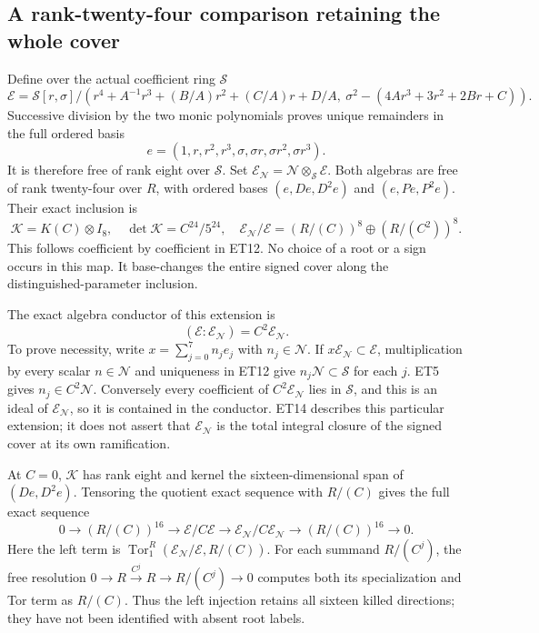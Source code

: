 \documentclass[11pt]{article}
\begin{document}
\subsection{A rank-twenty-four comparison retaining the whole cover}
Define over the actual coefficient ring $\mathscr S$
\[
 \mathscr E=\mathscr S[r,\sigma]/
 \left(r^4+A^{-1}r^3+(B/A)r^2+(C/A)r+D/A,\
       \sigma^2-(4Ar^3+3r^2+2Br+C)\right).
 \tag{ET11}
\]
Successive division by the two monic polynomials proves unique
remainders in the full ordered basis
\[
 e=(1,r,r^2,r^3,\sigma,\sigma r,\sigma r^2,\sigma r^3).
 \tag{ET12}
\]
It is therefore free of rank eight over $\mathscr S$.
Set $\mathscr E_{\mathscr N}=\mathscr N\otimes_{\mathscr S}\mathscr E$.
Both algebras are free of rank twenty-four over $R$, with ordered
bases $(e,De,D^2e)$ and $(e,Pe,P^2e)$. Their exact inclusion is
\[
 \mathcal K=K(C)\otimes I_8,\quad
 \det\mathcal K=C^{24}/5^{24},\quad
 \mathscr E_{\mathscr N}/\mathscr E
 =(R/(C))^8\oplus(R/(C^2))^8 .
 \tag{ET13}
\]
This follows coefficient by coefficient in ET12.
No choice of a root or a sign occurs in this map. It base-changes the
entire signed cover along the distinguished-parameter inclusion.

The exact algebra conductor of this extension is
\[
 (\mathscr E:\mathscr E_{\mathscr N})=C^2\mathscr E_{\mathscr N}.
 \tag{ET14}
\]
To prove necessity, write $x=\sum_{j=0}^7 n_j e_j$ with $n_j\in\mathscr N$.
If $x\mathscr E_{\mathscr N}\subset\mathscr E$, multiplication by every
scalar $n\in\mathscr N$ and uniqueness in ET12 give
$n_j\mathscr N\subset\mathscr S$ for each $j$. ET5 gives
$n_j\in C^2\mathscr N$. Conversely every coefficient of
$C^2\mathscr E_{\mathscr N}$ lies in $\mathscr S$, and this is an
ideal of $\mathscr E_{\mathscr N}$, so it is contained in the conductor.
ET14 describes this particular extension; it does not assert that
$\mathscr E_{\mathscr N}$ is the total integral closure of the signed
cover at its own ramification.

At $C=0$, $\mathcal K$ has rank eight and kernel the sixteen-dimensional
span of $(De,D^2e)$. Tensoring the quotient exact sequence with $R/(C)$
gives the full exact sequence
\[
 0\longrightarrow (R/(C))^{16}\longrightarrow
 \mathscr E/C\mathscr E\longrightarrow
 \mathscr E_{\mathscr N}/C\mathscr E_{\mathscr N}
 \longrightarrow(R/(C))^{16}\longrightarrow0 .
 \tag{ET15}
\]
Here the left term is $\operatorname{Tor}_1^R(
 \mathscr E_{\mathscr N}/\mathscr E,R/(C))$.
For each summand $R/(C^j)$, the free resolution
$0\to R\xrightarrow{C^j}R\to R/(C^j)\to0$
computes both its specialization and Tor term as $R/(C)$.
Thus the left injection retains all sixteen killed directions;
they have not been identified with absent root labels.
\end{document}
